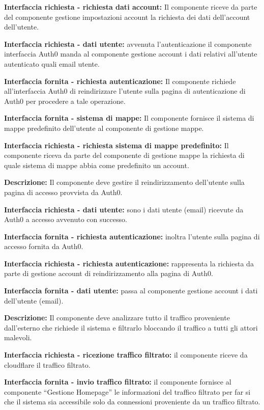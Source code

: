 \begin{listaPersonale}[]{}
    \textbf{Interfaccia richiesta - richiesta dati account:} Il componente riceve da parte del componente gestione impostazioni account la richiesta dei dati dell'account dell'utente.

    \textbf{Interfaccia richiesta - dati utente:} avvenuta l'autenticazione il componente interfaccia Auth0 manda al componente gestione account i dati relativi all'utente autenticato quali email utente.

    \textbf{Interfaccia fornita - richiesta autenticazione:} Il componente richiede all'interfaccia Auth0 di reindirizzare l'utente sulla pagina di autenticazione di Auth0 per procedere a tale operazione.

    \textbf{Interfaccia fornita - sistema di mappe:} Il componente fornisce il sistema di mappe predefinito dell'utente al componente di gestione mappe.

    \textbf{Interfaccia richiesta - richiesta sistema di mappe predefinito:} Il componente riceva da parte del componente di gestione mappe la richiesta di quale sistema di mappe abbia come predefinito un account.



    \textbf{Descrizione:} Il componente deve gestire il reindirizzamento dell'utente sulla pagina di accesso provvista da Auth0.

    \textbf{Interfaccia richiesta - dati utente:} sono i dati utente (email) ricevute da Auth0 a accesso avvenuto con successo.

    \textbf{Interfaccia fornita - richiesta autenticazione:} inoltra l'utente sulla pagina di accesso fornita da Auth0.

    \textbf{Interfaccia richiesta - richiesta autenticazione:} rappresenta la richiesta da parte di gestione account di reindirizzamento alla pagina di Auth0.

    \textbf{Interfaccia fornita - dati utente:} passa al componente gestione account i dati dell'utente (email).


    \elemento[Cloudflare]{}

    \textbf{Descrizione:} Il componente deve analizzare tutto il traffico proveniente dall'esterno che richiede il sistema e filtrarlo bloccando il traffico a tutti gli attori malevoli.

    \textbf{Interfaccia richiesta - ricezione traffico filtrato:} il componente riceve da cloudflare il traffico filtrato.

    \textbf{Interfaccia fornita - invio traffico filtrato:} il componente fornisce al componente “Gestione Homepage” le informazioni del traffico filtrato per far si che il sistema sia accessibile solo da connessioni proveniente da un traffico filtrato.

\end{listaPersonale}